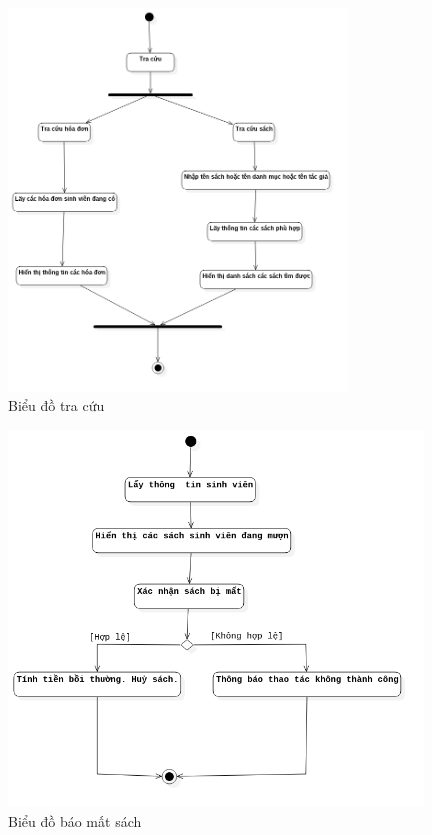 \documentclass[12pt]{report}
\begin{document}
\begin{figure}[H]
\centering
\includegraphics[width=9cm]{figures/tracuu.png}
\caption{Biểu đồ tra cứu}
\end{figure}

\begin{figure}[H]
\centering
\includegraphics[width=11cm]{figures/baomatsach.png}
\caption{Biểu đồ báo mất sách}
\end{figure}
\end{document}
